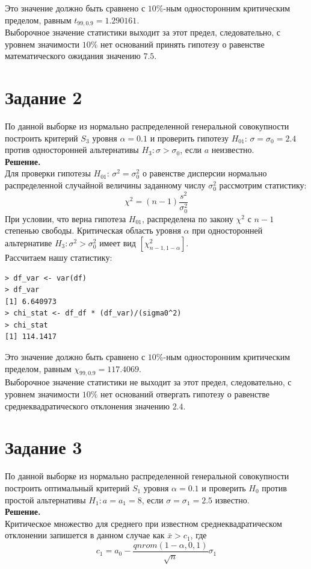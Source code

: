 \documentclass[14pt,a4paper]{scrartcl}
\begin{document}
Это значение должно быть сравнено с $10\%$-ным односторонним критическим пределом, равным $t_{99,0.9}=1.290161$.\\ Выборочное значение статистики выходит за этот предел, следовательно, с уровнем значимости $10\%$ нет оснований принять гипотезу о равенстве математического ожидания значению $7.5$.


\section*{Задание 2}\label{sec2}
По данной выборке из нормально  распределенной генеральной совокупности построить критерий $S_3$ уровня $\alpha=0.1$ и проверить гипотезу $H_{01}$: $\sigma=\sigma_0=2.4$  против односторонней альтернативы  $H_3: \sigma > \sigma_0$, если $a$ неизвестно.\\
\textbf{Решение.}\\
Для проверки гипотезы $H_{01}$: $\sigma^2=\sigma_0^2$ о равенстве дисперсии нормально распределенной случайной величины  заданному числу $\sigma_0^2$ рассмотрим статистику:
\begin{equation*}
	\chi^2 = (n-1)\frac{s^2}{\sigma_0^2}
\end{equation*}
При условии, что верна гипотеза $H_{01}$, распределена по закону $\chi^2$ с $n-1$ степенью свободы. Критическая область уровня $\alpha$ при односторонней альтернативе $H_3: \sigma^2 > \sigma_0^2$ имеет вид $[\chi^2_{n-1,1-\alpha}]$.\\
Рассчитаем нашу статистику:
\begin{verbatim}
> df_var <- var(df)
> df_var
[1] 6.640973
> chi_stat <- df_df * (df_var)/(sigma0^2)
> chi_stat
[1] 114.1417
\end{verbatim}

Это значение должно быть сравнено с $10\%$-ным односторонним критическим пределом, равным $\chi_{99,0.9}=117.4069$.\\ Выборочное значение статистики не выходит за этот предел, следовательно, с уровнем значимости $10\%$ нет оснований отвергать гипотезу о равенстве среднеквадратического отклонения значению $2.4$.


\section*{Задание 3}
По данной выборке из нормально  распределенной генеральной совокупности построить оптимальный критерий $S_1$ уровня $\alpha = 0.1$ и проверить $H_0$ против простой альтернативы $H_1:a=a_1=8$, если $\sigma=\sigma_1=2.5$ известно.\\
\textbf{Решение.}\\
Критическое множество для среднего при известном среднеквадратическом отклонении запишется в данном случае как $\bar{x} > c_1$, где
\begin{equation*}
	c_1 = a_0 - \frac{qnrom(1-\alpha,0,1)}{\sqrt{n}}\sigma_1
\end{equation*}
\end{document}
